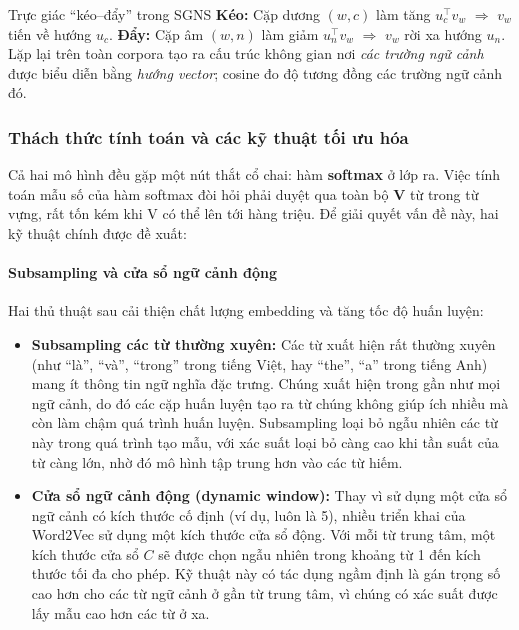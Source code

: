 \begin{keyidea}{Trực giác ``kéo--đẩy'' trong SGNS}
\textbf{Kéo:} Cặp dương $(w,c)$ làm tăng $u_c^\top v_w$ $\Rightarrow$ $v_w$ tiến về hướng $u_c$. 
\quad
\textbf{Đẩy:} Cặp âm $(w,n)$ làm giảm $u_n^\top v_w$ $\Rightarrow$ $v_w$ rời xa hướng $u_n$.
\\[3pt]
Lặp lại trên toàn corpora tạo ra cấu trúc không gian nơi \emph{các trường ngữ cảnh} được biểu diễn bằng \emph{hướng vector}; cosine đo độ tương đồng các trường ngữ cảnh đó.
\end{keyidea}

\subsubsection{Thách thức tính toán và các kỹ thuật tối ưu hóa}
Cả hai mô hình đều gặp một nút thắt cổ chai: hàm \textbf{softmax} ở lớp ra. Việc tính toán mẫu số của hàm softmax đòi hỏi phải duyệt qua toàn bộ \textbf{V} từ trong từ vựng, rất tốn kém khi V có thể lên tới hàng triệu. Để giải quyết vấn đề này, hai kỹ thuật chính được đề xuất:

\paragraph{Subsampling và cửa sổ ngữ cảnh động}
Hai thủ thuật sau cải thiện chất lượng embedding và tăng tốc độ huấn luyện:
\begin{itemize}
    \item \textbf{Subsampling các từ thường xuyên:} Các từ xuất hiện rất thường xuyên (như “là”, “và”, “trong” trong tiếng Việt, hay “the”, “a” trong tiếng Anh) mang ít thông tin ngữ nghĩa đặc trưng. Chúng xuất hiện trong gần như mọi ngữ cảnh, do đó các cặp huấn luyện tạo ra từ chúng không giúp ích nhiều mà còn làm chậm quá trình huấn luyện. Subsampling loại bỏ ngẫu nhiên các từ này trong quá trình tạo mẫu, với xác suất loại bỏ càng cao khi tần suất của từ càng lớn, nhờ đó mô hình tập trung hơn vào các từ hiếm.

    \item \textbf{Cửa sổ ngữ cảnh động (dynamic window):} Thay vì sử dụng một cửa sổ ngữ cảnh có kích thước cố định (ví dụ, luôn là 5), nhiều triển khai của Word2Vec sử dụng một kích thước cửa sổ động. Với mỗi từ trung tâm, một kích thước cửa sổ $C$ sẽ được chọn ngẫu nhiên trong khoảng từ 1 đến kích thước tối đa cho phép. Kỹ thuật này có tác dụng ngầm định là gán trọng số cao hơn cho các từ ngữ cảnh ở gần từ trung tâm, vì chúng có xác suất được lấy mẫu cao hơn các từ ở xa.
\end{itemize}

